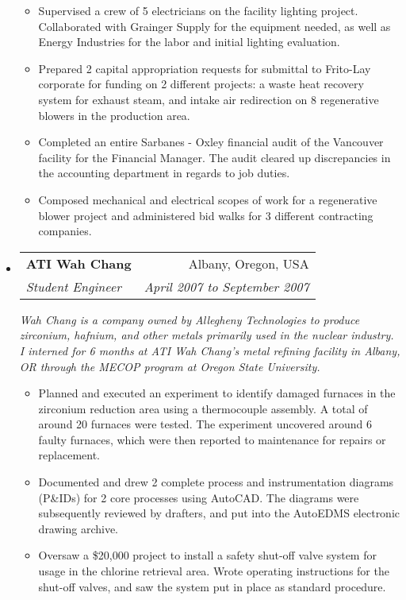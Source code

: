 \documentclass[a4paper,11pt]{article}
\makeatletter
\newcommand{\resitem}[1]{\item #1 \vspace{-2pt}}
\newcommand{\ressubheading}[4]{
\begin{tabular*}{6.5in}{l@{\cftdotfill{\cftsecdotsep}\extracolsep{\fill}}r}
        \textbf{#1} & #2 \\
        \textit{#3} & \textit{#4} \\
\end{tabular*}\vspace{-6pt}}
\makeatother
\begin{document}
\begin{itemize}
\begin{itemize}
            \resitem{Supervised a crew of 5 electricians on the facility lighting project. Collaborated with Grainger Supply for the equipment needed, as well as Energy Industries for the labor and initial lighting evaluation.}

            \resitem{Prepared 2 capital appropriation requests for submittal to Frito-Lay corporate for funding on 2 different projects: a waste heat recovery system for exhaust steam, and intake air redirection on 8 regenerative blowers in the production area.}

            \resitem{Completed an entire Sarbanes - Oxley financial audit of the Vancouver facility for the Financial Manager. The audit cleared up discrepancies in the accounting department in regards to job duties.}

            \resitem{Composed mechanical and electrical scopes of work for a regenerative blower project and administered bid walks for 3 different contracting companies.}

    \end{itemize}

\item

    \ressubheading{ATI Wah Chang}{Albany, Oregon, USA}{Student Engineer}{April 2007 to September 2007}
    \linebreak
    \linebreak
    \emph{Wah Chang is a company owned by Allegheny Technologies to produce zirconium, hafnium, and other metals primarily used in the nuclear industry. I interned for 6 months at ATI Wah Chang’s metal refining facility in Albany, OR through the MECOP program at Oregon State University.}
    \begin{itemize}
            \resitem{Planned and executed an experiment to identify damaged furnaces in the zirconium reduction area using a thermocouple assembly. A total of around 20 furnaces were tested. The experiment uncovered around 6 faulty furnaces, which were then reported to maintenance for repairs or replacement.}

            \resitem{Documented and drew 2 complete process and instrumentation diagrams (P\&IDs) for 2 core processes using AutoCAD. The diagrams were subsequently reviewed by drafters, and put into the AutoEDMS electronic drawing archive.}

            \resitem{Oversaw a \$20,000 project to install a safety shut-off valve system for usage in the chlorine retrieval area. Wrote operating instructions for the shut-off valves, and saw the system put in place as standard procedure.}

    \end{itemize}

\end{itemize}
\end{document}
